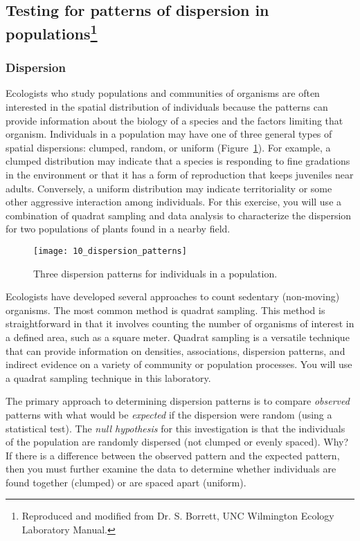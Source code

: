 \documentclass[12pt, hidelinks]{exam}
\begin{document}
\subsection*{Testing for patterns of dispersion in populations\footnote{Reproduced and modified from Dr. S. Borrett, UNC Wilmington Ecology Laboratory Manual.}}

\subsubsection*{Dispersion}

Ecologists who study populations and communities of
organisms are often interested in the spatial distribution of
individuals because the patterns can provide information
about the biology of a species and the factors limiting that
organism. Individuals in a population may have one of three general
types of spatial dispersions: clumped, random, or uniform (Figure~\ref{fig:dispersion_patterns}).
For example, a clumped distribution may indicate that a species is
responding to fine gradations in the environment or that it has a form
of reproduction that keeps juveniles near adults. Conversely, a uniform
distribution may indicate territoriality or some other aggressive
interaction among individuals. For this exercise, you will use a
combination of quadrat sampling and data analysis to characterize the
dispersion for two populations of plants found in a nearby field.

\begin{figure}[h!]
	\begin{center}
	\captionsetup{width=0.8\textwidth}
	\texttt{[image: 10\_dispersion\_patterns]}
	\caption{Three dispersion patterns for individuals in a population.}\label{fig:dispersion_patterns}
	\end{center}
\end{figure}

Ecologists have developed several approaches to count sedentary (non-moving)
 organisms. The most common method is quadrat sampling. This
method is straightforward in that it involves counting the number of
organisms of interest in a defined area, such as a square meter. 
Quadrat sampling is a versatile technique that can provide
information on densities, associations, dispersion patterns, and
indirect evidence on a variety of community or population processes. You
will use a quadrat sampling technique in this laboratory.

The primary approach to determining dispersion patterns is to compare
\emph{observed} patterns with what would be \emph{expected} if the
dispersion were random (using a statistical test). The \emph{null
hypothesis} for this investigation is that the individuals of the
population are randomly dispersed (not clumped or evenly spaced). Why?
If there is a difference between the observed pattern and the expected
pattern, then you must further examine the data to determine whether
individuals are found together (clumped) or are spaced apart (uniform).
\end{document}
